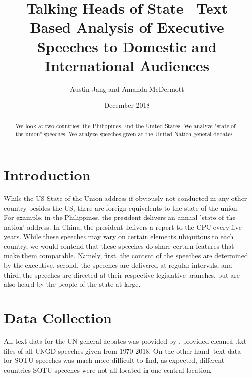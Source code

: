 \documentclass[12pt]{article}
\title{%
  Talking Heads of State \
  \large Text Based Analysis of Executive Speeches to Domestic and International Audiences}
\author{Austin Jang and Amanda McDermott}
\date{December 2018}
\begin{document}
\maketitle
\begin{abstract}
We look at two countries: the Philippines, and the United States. We analyze "state of the union" speeches.
We analyze speeches given at the United Nation general debates.
\end{abstract}
\doublespacing
\tableofcontents
\clearpage
\section{Introduction}
\label{sec:intro}
While the US State of the Union address if obviously not conducted in any other country besides the US, there are
foreign equivalents to the state of the union. For example, in the Philippines, the president delivers an annual 'state
of the nation' address. In China, the president delivers a report to the CPC every five years. While these speeches may vary
on certain elements ubiquitous to each country, we would contend that these speeches do share certain features that make them
comparable. Namely, first, the content of the speeches are determined by the executive, second, the speeches are delivered at
regular intervals, and third, the speeches are directed at their respective legislative branches, but are also heard by the people of the
state at large.

\section{Data Collection}
\label{sec:data}
All text data for the UN general debates was provided by \cite{baturo:08}. \cite{baturo:08} provided cleaned .txt files of all UNGD
speeches given from 1970-2018.  On the other hand, text data for SOTU speeches was much more difficult to find, as expected,
different countries SOTU speeches were not all located in one central location. 



\singlespacing 


\end{document}
